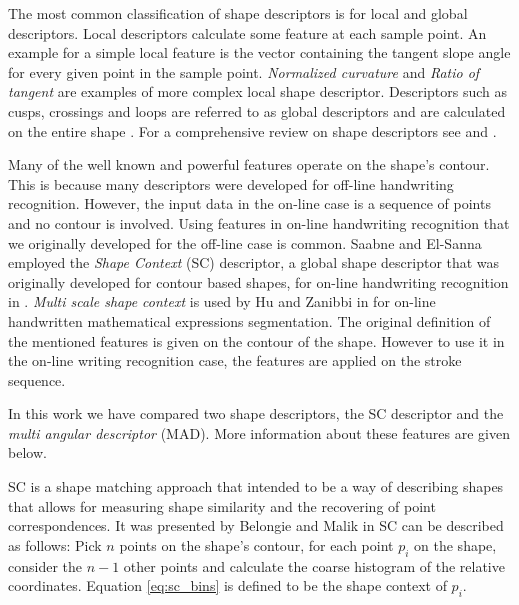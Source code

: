 \iftoggle{edit-mode}{\hspace{0pt}\marginpar{Shape descriptors types}}{}
The most common classification of shape descriptors is for local and global descriptors. 
Local descriptors calculate some feature at each sample point. 
An example for a simple local feature is the vector containing the tangent slope angle for every given point in the sample point. 
\emph{Normalized curvature} and \emph{Ratio of tangent} \cite{hu1995invariant, hu1996hmm} are examples of more complex local shape descriptor. 
Descriptors such as cusps, crossings and loops are referred to as global descriptors and are calculated on the entire shape \cite{hu1997combining}. 
For a comprehensive review on shape descriptors see \cite{zhang2004review} and \cite{yang2008survey}.


\iftoggle{edit-mode}{\hspace{0pt}\marginpar{Using off-line shape descriptors for on-line HWR}}{}
Many of the well known and powerful features operate on the shape's contour. 
This is because many descriptors were developed for off-line handwriting recognition. 
However, the input data in the on-line case is a sequence of points and no contour is involved. 
Using features in on-line handwriting recognition that we originally developed for the off-line case is common. 
Saabne and El-Sanna employed the \emph{Shape Context} (SC) descriptor, a global shape descriptor that was originally developed for contour based shapes, for on-line handwriting recognition in \cite{saabni2009hierarchical}. 
\emph{Multi scale shape context} is used by Hu and Zanibbi in \cite{husegmenting} for on-line handwritten mathematical expressions segmentation. 
The original definition of the mentioned features is given on the contour of the shape. 
However to use it in the on-line writing recognition case, the features are applied on the stroke sequence.

\iftoggle{edit-mode}{\hspace{0pt}\marginpar{Selected Descriptors}}{}
In this work we have compared two shape descriptors, the SC descriptor and the \emph{multi angular descriptor} (MAD). 
More information about these features are given below.

\iftoggle{edit-mode}{\hspace{0pt}\marginpar{Shape Context}}{}
SC is a shape matching approach that intended to be a way of describing shapes that allows for measuring shape similarity and the recovering of point correspondences. 
It was presented by Belongie and Malik in \cite{belongie2002shape}
SC can be described as follows: Pick $n$ points on the shape's contour, for each point ${p_i}$ on the shape, consider the $n - 1$ other points and calculate the coarse histogram of the relative coordinates. 
Equation \ref{eq:sc_bins} is defined to be the shape context of ${p_i}$.

